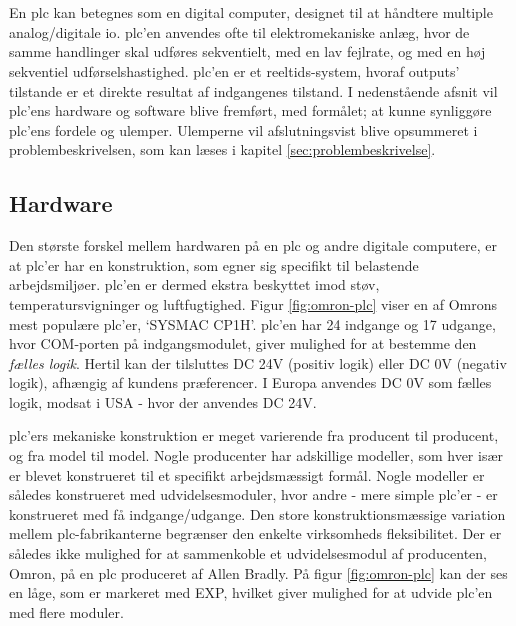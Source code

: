 \section{}
En \gls{plc} kan betegnes som en digital computer, designet til at håndtere multiple analog/digitale \gls{io}. \gls{plc}'en anvendes ofte til elektromekaniske anlæg, hvor de samme handlinger skal udføres sekventielt, med en lav fejlrate, og med en høj sekventiel udførselshastighed. \gls{plc}'en er et reeltids-system, hvoraf outputs' tilstande er et direkte resultat af indgangenes tilstand. I nedenstående afsnit vil \gls{plc}'ens hardware og software blive fremført, med formålet; at kunne synliggøre \gls{plc}'ens fordele og ulemper. Ulemperne vil afslutningsvist blive opsummeret i problembeskrivelsen, som kan læses i kapitel \ref{sec:problembeskrivelse}. \cite{PLC_hardware_desc}

\subsection{Hardware}
\label{subsec:pa-hardware}
Den største forskel mellem hardwaren på en \gls{plc} og andre digitale computere, er at \gls{plc}'er har en konstruktion, som egner sig specifikt til belastende arbejdsmiljøer. \gls{plc}'en er dermed ekstra beskyttet imod støv, temperatursvigninger og luftfugtighed. Figur \ref{fig:omron-plc} viser en af Omrons mest populære \gls{plc}'er, \enquote*{SYSMAC CP1H}. \gls{plc}'en har 24 indgange og 17 udgange, hvor COM-porten på indgangsmodulet, giver mulighed for at bestemme den \textit{fælles logik}. Hertil kan der tilsluttes DC 24V (positiv logik) eller DC 0V (negativ logik), afhængig af kundens præferencer. I Europa anvendes DC 0V som fælles logik, modsat i USA - hvor der anvendes DC 24V. 


\noindent \gls{plc}'ers mekaniske konstruktion er meget varierende fra producent til producent, og fra model til model. Nogle producenter har adskillige modeller, som hver især er blevet konstrueret til et specifikt arbejdsmæssigt formål. Nogle modeller er således konstrueret med udvidelsesmoduler, hvor andre - mere simple \gls{plc}'er - er konstrueret med få indgange/udgange. 
Den store konstruktionsmæssige variation mellem \gls{plc}-fabrikanterne begrænser den enkelte virksomheds fleksibilitet. Der er således ikke mulighed for at sammenkoble et udvidelsesmodul af producenten, Omron, på en \gls{plc} produceret af Allen Bradly\cite{PLC-comb}. På figur \ref{fig:omron-plc} kan der ses en låge, som er markeret med EXP, hvilket giver mulighed for at udvide \gls{plc}'en med flere moduler.

